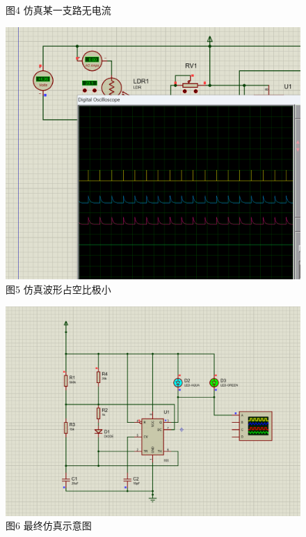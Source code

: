 \documentclass[a4paper,12pt]{article}
\begin{document}
\begin{enumerate}
\begin{figure}[h]
\begin{minipage}{0.4\textwidth}
				\caption*{图4 仿真某一支路无电流}
			\end{minipage}
			\qquad
			\begin{minipage}{0.4\textwidth}
				\centering
				\includegraphics[width=\textwidth]{5.png}
				\caption*{图5 仿真波形占空比极小}
			\end{minipage}
			\end{figure}
			\begin{figure}[h]
				\centering
				\begin{minipage}{0.4\textwidth}
					\centering
					\includegraphics[width=\textwidth]{6.png}
					\caption*{图6 最终仿真示意图}
				\end{minipage}

\end{figure}
\end{enumerate}
\end{document}
